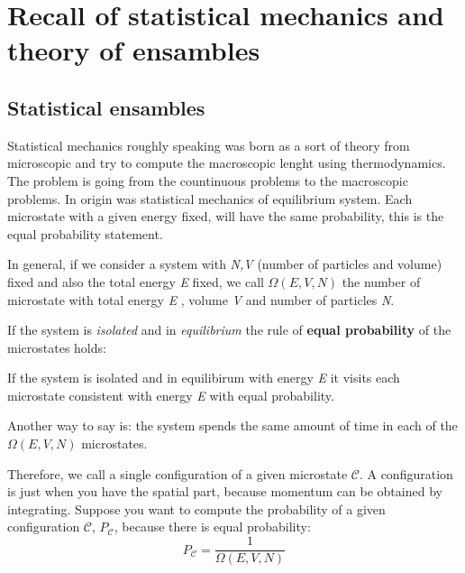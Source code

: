 \documentclass[../main/main.tex]{subfiles}
\begin{document}
\chapter{Recall of statistical mechanics and theory of ensambles}

\section{Statistical ensambles}
Statistical mechanics roughly speaking was born as a sort of theory from microscopic and try to compute the macroscopic lenght using thermodynamics. The problem is going from the countinuous problems to the macroscopic problems. In origin was statistical mechanics of equilibrium system. Each microstate with a given energy fixed, will have the same probability, this is the equal probability statement.

In general, if we consider a system with \emph{N,V} (number of particles and volume) fixed and also the total energy \emph{E} fixed, we call \( \Omega (E,V,N) \)  the number of microstate with total energy \emph{E} , volume \emph{V} and number of particles \emph{N}.

If the system is \emph{isolated} and in \emph{equilibrium} the rule of \textbf{equal probability} of the microstates holds:
\begin{orangebox}
If the system is isolated and in equilibirum with energy \emph{E} it visits each microstate consistent with energy \emph{E} with equal probability.
\end{orangebox}
Another way to say is: the system spends the same amount of time in each of the \( \Omega (E,V,N) \) microstates.

Therefore, we call  a single configuration of a given microstate \( \mathcal{C}  \). A configuration is just when you have the spatial part, because momentum can be obtained by integrating.
Suppose you want to compute the probability of a given configuration \( \mathcal{C}  \), \( P_{\mathcal{C}} \), because there is equal probability:
\begin{equation}
  P_{\mathcal{C}} = \frac{1}{\Omega (E,V,N)}
  \label{eq:}
\end{equation}
\end{document}
